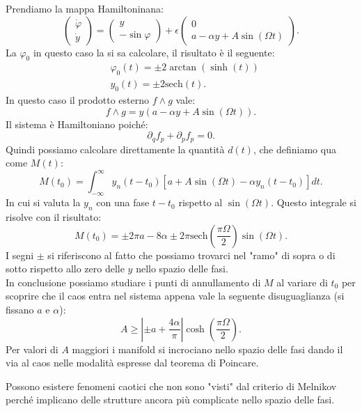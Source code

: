 \begin{exmp}
    Prendiamo la mappa Hamiltoninana:
    \[
        \begin{pmatrix} \dot{\varphi} \\ \dot{y}\end{pmatrix} =
	\begin{pmatrix} y \\ -\sin\varphi \end{pmatrix} +
	\epsilon  \begin{pmatrix} 0 \\ a - \alpha y + A \sin (\Omega  t)\end{pmatrix} 
    .\] 
    La $\varphi_0$ in questo caso la si sa calcolare, il risultato è il seguente:
    \[\begin{aligned}
	&\varphi_0(t) = \pm 2 \arctan(\sinh(t))\\
	& y_0(t) = \pm 2 \text{sech}(t)
    .\end{aligned}\]
    In questo caso il prodotto esterno $f \wedge g$ vale:
    \[
	f \wedge g = y (a-\alpha y + A \sin (\Omega  t))
    .\] 
    Il sistema è Hamiltoniano poiché:
    \[
        \partial_{q}f_p + \partial_{p}f_p = 0
    .\] 
    Quindi possiamo calcolare direttamente la quantità $d(t)$, che definiamo qua come $M(t)$:
    \[
	M(t_0)= \int_{-\infty}^{\infty} y_{n} (t-t_0)\left[a+A\sin (\Omega  t) - \alpha y_n (t-t_0)\right]dt
    .\] 
    In cui si valuta la $y_n$ con una fase $t-t_0$ rispetto al $\sin (\Omega t)$.
    Questo integrale si risolve con il risultato:
    \[
	M(t_0)= \pm 2\pi a - 8\alpha  \pm 2\pi\text{sech}\left(\frac{\pi\Omega}{2}\right)\sin (\Omega t)
    .\]
    I segni $\pm$  si riferiscono al fatto che possiamo trovarci nel "ramo" di sopra o di sotto rispetto allo zero delle $y$  nello spazio delle fasi.\\
    In conclusione possiamo studiare i punti di annullamento di $M$ al variare di $t_0$ per scoprire che il caos entra nel sistema appena vale la seguente disuguaglianza (si fissano $a$ e $\alpha$):
    \[
	A \ge \left|\pm a + \frac{4\alpha}{\pi}\right|\cosh(\frac{\pi\Omega}{2})
    .\] 
    Per valori di $A$ maggiori i manifold si incrociano nello spazio delle fasi dando il via al caos nelle modalità espresse dal teorema di Poincare. 
\end{exmp}
\noindent
Possono esistere fenomeni caotici che non sono "visti" dal criterio di Melnikov perché implicano delle strutture ancora più complicate nello spazio delle fasi.
